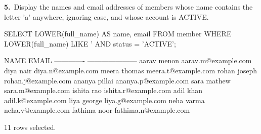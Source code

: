 \noindent\begin{minipage}{\linewidth}
\begingroup{}
{\fontsize{14}{17}\selectfont\textbf{5.}}\ Display the names and email addresses of members whose name contains the letter 'a' anywhere, ignoring case, and whose account is ACTIVE.\par
\endgroup\vspace{12pt}


\begin{sqlcode}
SELECT LOWER(full_name) AS name, email
FROM member
WHERE LOWER(full_name) LIKE '%
  AND status = 'ACTIVE';
\end{sqlcode}

\vspace{18pt}


\begin{sqlout}[fontsize=\small]
NAME           EMAIL                
-------------  ---------------------
aarav menon    aarav.m@example.com
diya nair      diya.n@example.com
meera thomas   meera.t@example.com
rohan joseph   rohan.j@example.com
ananya pillai  ananya.p@example.com
sara mathew    sara.m@example.com
ishita rao     ishita.r@example.com
adil khan      adil.k@example.com
liya george    liya.g@example.com
neha varma     neha.v@example.com
fathima noor   fathima.n@example.com

11 rows selected.
\end{sqlout}
\end{minipage}\par\vspace{24pt}


